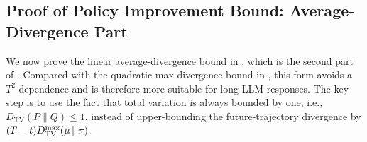 \subsection{Proof of Policy Improvement Bound: Average-Divergence Part}
\label{app:tighter_bound}  
  
We now prove the linear average-divergence bound in , which is the second part of . Compared with the quadratic max-divergence bound in , this form avoids a $T^2$ dependence and is therefore more suitable for long LLM responses. The key step is to use the fact that total variation is always bounded by one, i.e., $D_{\mathrm{TV}}(P \|  Q) \le 1$, instead of upper-bounding the future-trajectory divergence by $(T-t)D_{\mathrm{TV}}^{\max}(\operatorname*{{\textcolor{black}{\mu}}}\|\operatorname*{{\textcolor{black}{\pi}}})$.
  
